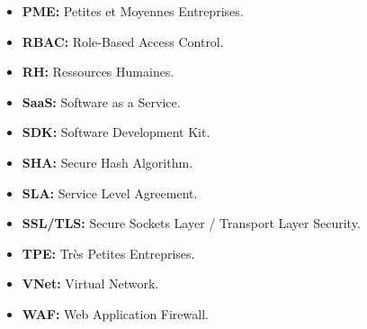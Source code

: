 \begin{itemize}
    \item \textbf{PME:} Petites et Moyennes Entreprises.
    \item \textbf{RBAC:} Role-Based Access Control.
    \item \textbf{RH:} Ressources Humaines.
    \item \textbf{SaaS:} Software as a Service.
    \item \textbf{SDK:} Software Development Kit.
    \item \textbf{SHA:} Secure Hash Algorithm.
    \item \textbf{SLA:} Service Level Agreement.
    \item \textbf{SSL/TLS:} Secure Sockets Layer / Transport Layer Security.
    \item \textbf{TPE:} Très Petites Entreprises.
    \item \textbf{VNet:} Virtual Network.
    \item \textbf{WAF:} Web Application Firewall.
\end{itemize}
